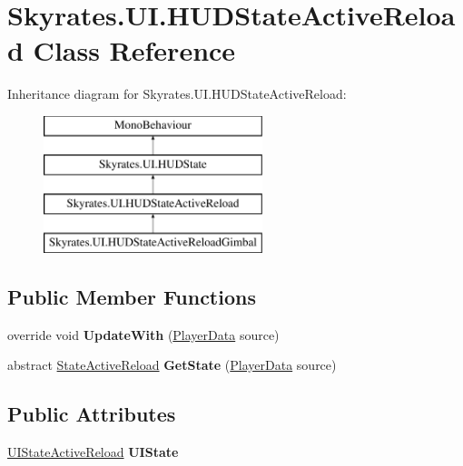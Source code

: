 \hypertarget{class_skyrates_1_1_u_i_1_1_h_u_d_state_active_reload}{\section{Skyrates.\-U\-I.\-H\-U\-D\-State\-Active\-Reload Class Reference}
\label{class_skyrates_1_1_u_i_1_1_h_u_d_state_active_reload}
}
Inheritance diagram for Skyrates.\-U\-I.\-H\-U\-D\-State\-Active\-Reload\-:\begin{figure}[H]
\begin{center}
\leavevmode
\includegraphics[height=4.000000cm]{class_skyrates_1_1_u_i_1_1_h_u_d_state_active_reload}
\end{center}
\end{figure}
\subsection*{Public Member Functions}
\begin{DoxyCompactItemize}
\item 
\hypertarget{class_skyrates_1_1_u_i_1_1_h_u_d_state_active_reload_ae8c62dc753bf8ed176805d0864b69e08}{override void {\bfseries Update\-With} (\hyperlink{class_skyrates_1_1_data_1_1_player_data}{Player\-Data} source)}\label{class_skyrates_1_1_u_i_1_1_h_u_d_state_active_reload_ae8c62dc753bf8ed176805d0864b69e08}

\item 
\hypertarget{class_skyrates_1_1_u_i_1_1_h_u_d_state_active_reload_adc08ac6d1afe6901d5690bae7a1817d7}{abstract \hyperlink{class_skyrates_1_1_misc_1_1_state_active_reload}{State\-Active\-Reload} {\bfseries Get\-State} (\hyperlink{class_skyrates_1_1_data_1_1_player_data}{Player\-Data} source)}\label{class_skyrates_1_1_u_i_1_1_h_u_d_state_active_reload_adc08ac6d1afe6901d5690bae7a1817d7}

\end{DoxyCompactItemize}
\subsection*{Public Attributes}
\begin{DoxyCompactItemize}
\item 
\hypertarget{class_skyrates_1_1_u_i_1_1_h_u_d_state_active_reload_a517be58a8c133b6ef6f13c3d812ec17b}{\hyperlink{class_skyrates_1_1_u_i_1_1_u_i_state_active_reload}{U\-I\-State\-Active\-Reload} {\bfseries U\-I\-State}}\label{class_skyrates_1_1_u_i_1_1_h_u_d_state_active_reload_a517be58a8c133b6ef6f13c3d812ec17b}

\end{DoxyCompactItemize}
